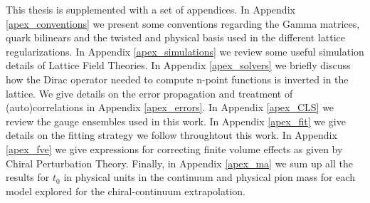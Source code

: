 This thesis is supplemented with a set of appendices. In Appendix \ref{apex_conventions} we present some conventions regarding the Gamma matrices, quark bilinears and the twisted and physical basis used in the different lattice regularizations. In Appendix \ref{apex_simulations} we review some useful simulation details of Lattice Field Theories. In Appendix \ref{apex_solvers} we briefly discuss how the Dirac operator needed to compute n-point functions is inverted in the lattice. We give details on the error propagation and treatment of (auto)correlations in Appendix \ref{apex_errors}. In Appendix \ref{apex_CLS} we review the gauge ensembles used in this work. In Appendix \ref{apex_fit} we give details on the fitting strategy we follow throughtout this work. In Appendix \ref{apex_fve} we give expressions for correcting finite volume effects as given by Chiral Perturbation Theory. Finally, in Appendix \ref{apex_ma} we sum up all the results for $t_0$ in physical units in the continuum and physical pion mass for each model explored for the chiral-continuum extrapolation.

